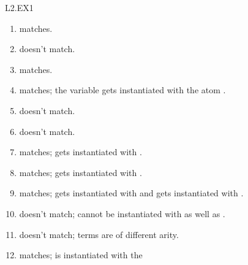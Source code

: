 \begin{mozartANSWER}{L2.EX1}\begin{enumerate}
\item{} matches.
\item{} doesn't match.
\item{} matches.
\item{} matches; the variable  gets instantiated with the atom .
\item{} doesn't match.
\item{} doesn't match.
\item{} matches;  gets  instantiated with .
\item{} matches;  gets  instantiated with .
\item{} matches;  gets \mozartEMPTY
instantiated with  and  gets  instantiated with \mozartEMPTY
{}.
\item{} doesn't match; \mozartEMPTY
{} cannot be instantiated with  as well as .
\item{} doesn't match; \mozartEMPTY
terms are of different arity.
\item{} matches;  is instantiated with the \mozartEMPTY

\end{enumerate}
\end{mozartANSWER}
